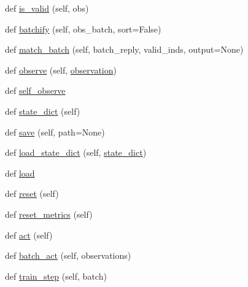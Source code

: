 \begin{DoxyCompactItemize}
\item 
def \hyperlink{classparlai_1_1core_1_1torch__agent_1_1TorchAgent_afa491bf2384b017711ad722b5341b405}{is\+\_\+valid} (self, obs)
\item 
def \hyperlink{classparlai_1_1core_1_1torch__agent_1_1TorchAgent_a4c5824776df0c6cf995984a5e7a3f433}{batchify} (self, obs\+\_\+batch, sort=False)
\item 
def \hyperlink{classparlai_1_1core_1_1torch__agent_1_1TorchAgent_aba56b961d929e5c5b5da9cf8bd331502}{match\+\_\+batch} (self, batch\+\_\+reply, valid\+\_\+inds, output=None)
\item 
def \hyperlink{classparlai_1_1core_1_1torch__agent_1_1TorchAgent_a87b18f0d6ab11be3c49375af072d0d33}{observe} (self, \hyperlink{classparlai_1_1core_1_1torch__agent_1_1TorchAgent_a4bc525b20568822a042b3bbfa3da3a69}{observation})
\item 
def \hyperlink{classparlai_1_1core_1_1torch__agent_1_1TorchAgent_a663cb0d6a276495d03aacdb8b9c79fb0}{self\+\_\+observe}
\item 
def \hyperlink{classparlai_1_1core_1_1torch__agent_1_1TorchAgent_a9f89e606931a4622a5c6a6f6b832235c}{state\+\_\+dict} (self)
\item 
def \hyperlink{classparlai_1_1core_1_1torch__agent_1_1TorchAgent_adac7ee3db855786e8414e9f35fcb6e46}{save} (self, path=None)
\item 
def \hyperlink{classparlai_1_1core_1_1torch__agent_1_1TorchAgent_a5dcfca62a677f8de97f09ce993258f84}{load\+\_\+state\+\_\+dict} (self, \hyperlink{classparlai_1_1core_1_1torch__agent_1_1TorchAgent_a9f89e606931a4622a5c6a6f6b832235c}{state\+\_\+dict})
\item 
def \hyperlink{classparlai_1_1core_1_1torch__agent_1_1TorchAgent_ac345f2da892d35d9f4921e0acf5594c8}{load}
\item 
def \hyperlink{classparlai_1_1core_1_1torch__agent_1_1TorchAgent_a6f568650dd8e245a274671680ebb7587}{reset} (self)
\item 
def \hyperlink{classparlai_1_1core_1_1torch__agent_1_1TorchAgent_a03e18955cfd44dd019d0847bc7a46893}{reset\+\_\+metrics} (self)
\item 
def \hyperlink{classparlai_1_1core_1_1torch__agent_1_1TorchAgent_a51174dfa508970e3392246b02d0d94b5}{act} (self)
\item 
def \hyperlink{classparlai_1_1core_1_1torch__agent_1_1TorchAgent_a7754a74d6c87590f46e71ec486c285a8}{batch\+\_\+act} (self, observations)
\item 
def \hyperlink{classparlai_1_1core_1_1torch__agent_1_1TorchAgent_a8ba9d535736c0af100d00c5e7b02b61b}{train\+\_\+step} (self, batch)

\end{DoxyCompactItemize}
